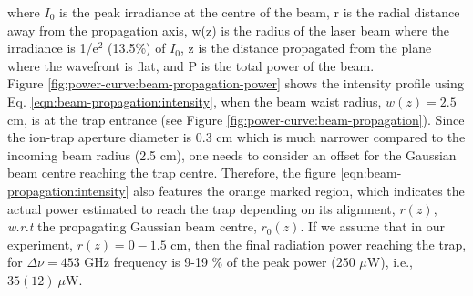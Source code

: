 where $I_0$ is the peak irradiance at the centre of the beam, r is the radial
distance away from the propagation axis, w(z) is the radius of the laser beam
where the irradiance is 1/e$^2$ (13.5\%) of $I_0$, z is the distance propagated
from the plane where the wavefront is flat, and P is the total power of the
beam.\\

Figure \ref{fig:power-curve:beam-propagation-power} shows the intensity profile
using Eq. \ref{eqn:beam-propagation:intensity}, when the beam waist radius,
$w(z)=2.5$ cm, is at the trap entrance (see Figure
\ref{fig:power-curve:beam-propagation}). Since the ion-trap aperture diameter
is 0.3 cm which is much narrower compared to the incoming beam radius (2.5 cm),
one needs to consider an offset for the Gaussian beam centre reaching the trap
centre. Therefore, the figure \ref{eqn:beam-propagation:intensity} also
features the orange marked region, which indicates the actual power estimated
to reach the trap depending on its alignment, $r(z)$, \emph{w.r.t} the
propagating Gaussian beam centre, $r_0(z)$. If we assume that in our
experiment, $r(z)=0-1.5$ cm, then the final radiation power reaching the trap,
for $\Delta \nu=453$ GHz frequency is 9-19 \% of the peak power (250 $\mu$W),
i.e., $35(12)\ \mu$W.

